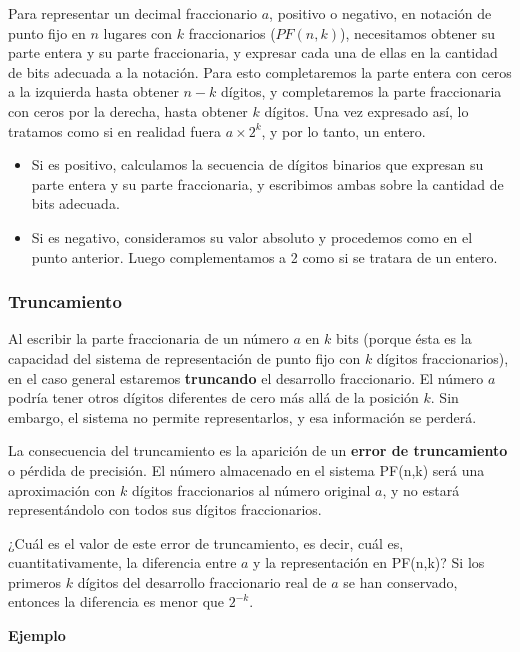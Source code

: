 \documentclass[spanish,A4,]{article}
\begin{document}
Para representar un decimal fraccionario $a$, positivo o negativo, en
notación de punto fijo en $n$ lugares con $k$ fraccionarios ($PF(n,k)$),
necesitamos obtener su parte entera y su parte fraccionaria, y expresar
cada una de ellas en la cantidad de bits adecuada a la notación. Para
esto completaremos la parte entera con ceros a la izquierda hasta
obtener $n-k$ dígitos, y completaremos la parte fraccionaria con ceros
por la derecha, hasta obtener $k$ dígitos. Una vez expresado así, lo
tratamos como si en realidad fuera $a \times 2^k$, y por lo tanto, un
entero.

\begin{itemize}
\itemsep1pt\parskip0pt
\item
  Si es positivo, calculamos la secuencia de dígitos binarios que
  expresan su parte entera y su parte fraccionaria, y escribimos ambas
  sobre la cantidad de bits adecuada.
\item
  Si es negativo, consideramos su valor absoluto y procedemos como en el
  punto anterior. Luego complementamos a 2 como si se tratara de un
  entero.
\end{itemize}

\subsubsection{Truncamiento}\label{truncamiento}

Al escribir la parte fraccionaria de un número $a$ en $k$ bits (porque
ésta es la capacidad del sistema de representación de punto fijo con $k$
dígitos fraccionarios), en el caso general estaremos \textbf{truncando}
el desarrollo fraccionario. El número $a$ podría tener otros dígitos
diferentes de cero más allá de la posición $k$. Sin embargo, el sistema
no permite representarlos, y esa información se perderá.

La consecuencia del truncamiento es la aparición de un \textbf{error de
truncamiento} o pérdida de precisión. El número almacenado en el sistema
PF(n,k) será una aproximación con $k$ dígitos fraccionarios al número
original $a$, y no estará representándolo con todos sus dígitos
fraccionarios.

¿Cuál es el valor de este error de truncamiento, es decir, cuál es,
cuantitativamente, la diferencia entre $a$ y la representación en
PF(n,k)? Si los primeros $k$ dígitos del desarrollo fraccionario real de
$a$ se han conservado, entonces la diferencia es menor que $2^{-k}$.

\textbf{Ejemplo}
\end{document}
